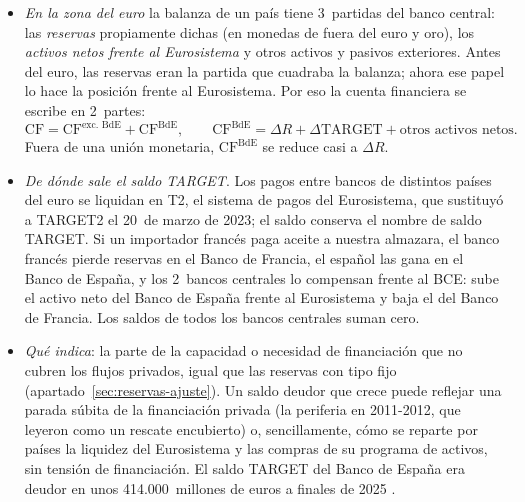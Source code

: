 \documentclass[11pt]{article}
\begin{document}
\begin{itemize}
\item \emph{En la zona del euro} la balanza de un país tiene 3~partidas del banco central: las \emph{reservas} propiamente dichas (en monedas de fuera del euro y oro), los \emph{activos netos frente al Eurosistema} y otros activos y pasivos exteriores. Antes del euro, las reservas eran la partida que cuadraba la balanza; ahora ese papel lo hace la posición frente al Eurosistema. Por eso la cuenta financiera se escribe en 2~partes:
\[
\mathrm{CF}=\mathrm{CF}^{\text{exc. BdE}}+\mathrm{CF}^{\text{BdE}},\qquad \mathrm{CF}^{\text{BdE}}=\Delta R+\Delta\text{TARGET}+\text{otros activos netos} .
\]
Fuera de una unión monetaria, $\mathrm{CF}^{\text{BdE}}$ se reduce casi a $\Delta R$.
\item \emph{De dónde sale el saldo TARGET}. Los pagos entre bancos de distintos países del euro se liquidan en T2, el sistema de pagos del Eurosistema, que sustituyó a TARGET2 el 20~de marzo de 2023; el saldo conserva el nombre de saldo TARGET\nocite{BCE2023T2}. Si un importador francés paga aceite a nuestra almazara, el banco francés pierde reservas en el Banco de Francia, el español las gana en el Banco de España, y los 2~bancos centrales lo compensan frente al BCE: sube el activo neto del Banco de España frente al Eurosistema y baja el del Banco de Francia. Los saldos de todos los bancos centrales suman cero.
\item \emph{Qué indica}: la parte de la capacidad o necesidad de financiación que no cubren los flujos privados, igual que las reservas con tipo fijo (apartado~\ref{sec:reservas-ajuste}). Un saldo deudor que crece puede reflejar una parada súbita de la financiación privada (la periferia en 2011-2012, que \textcite{SinnWollmershauser2012} leyeron como un rescate encubierto) o, sencillamente, cómo se reparte por países la liquidez del Eurosistema y las compras de su programa de activos, sin tensión de financiación\nocite{Whelan2014}. El saldo TARGET del Banco de España era deudor en unos 414.000~millones de euros a finales de 2025\nocite{BCE2026TARGET} .
\end{itemize}
\end{document}
